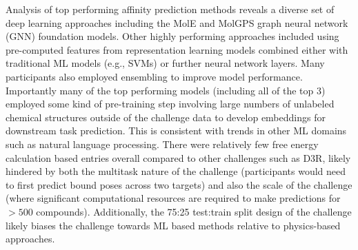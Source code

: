 \documentclass[journal=jcim,manuscript=article]{achemso}
\begin{document}
Analysis of top performing affinity prediction methods reveals a diverse set of deep learning approaches including the MolE\cite{mendez-lucio_mole_2024} and MolGPS\cite{sypetkowski2024scalabilitygnnsmoleculargraphs} graph neural network (GNN) foundation models. Other highly performing approaches included using pre-computed features from representation learning models combined either with traditional ML models (e.g., SVMs) or further neural network layers. Many participants also employed ensembling to improve model performance.  Importantly many of the top performing models (including all of the top 3) employed some kind of pre-training step involving large numbers of unlabeled chemical structures outside of the challenge data to develop embeddings for downstream task prediction. This is consistent with trends in other ML domains such as natural language processing\cite{radford2019language}. There were relatively few free energy calculation based entries overall compared to other challenges such as D3R\cite{parks_gaieb_chiu_yang_shao_walters_jansen_mcgaughey_lewis_bembenek_et}, likely hindered by both the multitask nature of the challenge (participants would need to first predict bound poses across two targets) and also the scale of the challenge (where significant computational resources are required to make predictions for $>500$ compounds). Additionally, the 75:25 test:train split design of the challenge likely biases the challenge towards ML based methods relative to physics-based approaches.
\end{document}
